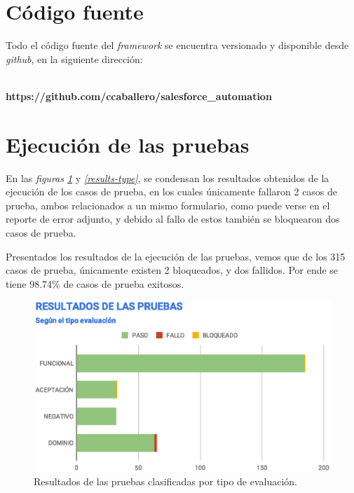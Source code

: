 \section{Código fuente}
Todo el código fuente del \emph{framework} se encuentra versionado y disponible
desde \emph{github}, en la siguiente dirección:
\\
\\
\centerline{\textbf{https://github.com/ccaballero/salesforce\_automation}}

\section{Ejecución de las pruebas}
En las \emph{figuras \ref{results-tests}} y \emph{\ref{results-type}}, se
condensan los resultados obtenidos de la ejecución de los casos de prueba, en
los cuales únicamente fallaron 2 casos de prueba, ambos relacionados a un mismo
formulario, como puede verse en el reporte de error adjunto, y debido al fallo
de estos también se bloquearon dos casos de prueba.

Presentados los resultados de la ejecución de las pruebas, vemos que de los 315
casos de prueba, únicamente existen 2 bloqueados, y dos fallidos. Por ende se
tiene 98.74\% de casos de prueba exitosos.

\begin{figure}
\centering
\includegraphics[width=1.0\textwidth]{graphics/results-tests.eps}
\caption{Resultados de las pruebas clasificadas por tipo de evaluación.}
\label{results-tests}
\end{figure}

